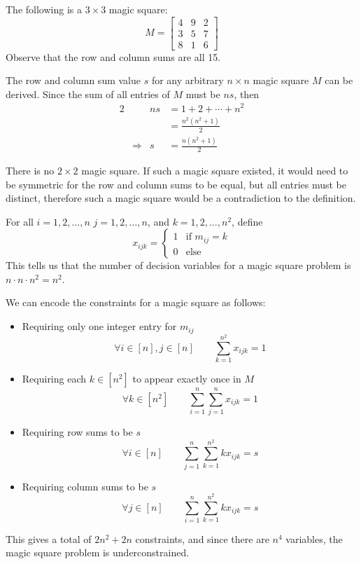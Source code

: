 \begin{exm}
    The following is a $3\times3$ magic square:
    \[
        M = \begin{bmatrix}
                4 & 9 & 2 \\
                3 & 5 & 7 \\
                8 & 1 & 6
            \end{bmatrix}
    \]
    Observe that the row and column sums are all 15.
\end{exm}

\begin{obs}
    The row and column sum value $s$ for any arbitrary $n \times n$ magic square $M$ can be derived. Since the sum of all entries of $M$ must be $ns$, then 
    \begin{alignat*}{2}
        &                   & ns    &= 1 + 2 + \cdots + n^2  \\
        &                   &       &=\frac{n^2(n^2+1)}{2} \\
        & \Longrightarrow   & s     &= \frac{n(n^2+1)}{2}
    \end{alignat*}
\end{obs}

\begin{obs}
    There is no $2 \times 2$ magic square. If such a magic square existed, it would need to be symmetric for the row and column sums to be equal, but all entries must be distinct, therefore such a magic square would be a contradiction to the definition.
\end{obs}

\begin{defn}
    For all $i = 1, 2, \dots, n$ $j = 1,2,\dots,n$, and $k = 1,2,\dots, n^2$, define
    \[
        x_{ijk} = \begin{cases}
                    1 & \text{if } m_{ij} = k \\
                    0 & \text{else}
                  \end{cases}
    \]
    This tells us that the number of decision variables for a magic square problem is $n \cdot n \cdot n^2 = n^2$.
\end{defn}

\noindent We can encode the constraints for a magic square as follows:
\begin{itemize}
    \item Requiring only one integer entry for $m_{ij}$
    \[
        \forall i \in [n], j \in [n] \quad\quad \sum_{k=1}^{n^2} x_{ijk} = 1
    \]
    \item Requiring each $k \in [n^2]$ to appear exactly once in $M$
    \[
        \forall k \in [n^2] \quad\quad \sum_{i=1}^n\sum_{j=1}^n x_{ijk} = 1
    \]
    \item Requiring row sums to be $s$
    \[
        \forall i \in [n] \quad\quad \sum_{j=1}^n\sum_{k=1}^{n^2} kx_{ijk} = s
    \]
    \item Requiring column sums to be $s$
    \[
        \forall j \in [n] \quad\quad \sum_{i=1}^n\sum_{k=1}^{n^2} kx_{ijk} = s
    \]
\end{itemize}
This gives a total of $2n^2 + 2n$ constraints, and since there are $n^4$ variables, the magic square problem is underconstrained.

